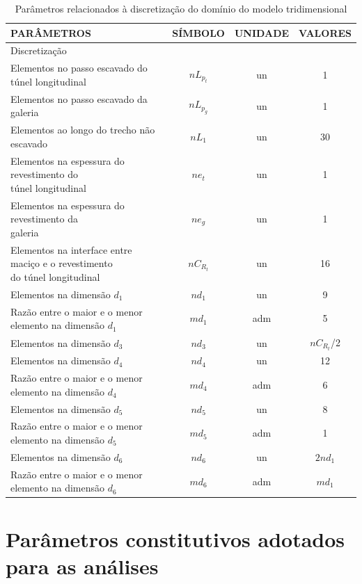 \begin{table}[H]
	\caption{Parâmetros relacionados à discretização do domínio do modelo tridimensional}
	\label{tabela3D_2}
	\centering
	\small
	\renewcommand{\arraystretch}{1.5}
	\begin{tabular}{l c c c}
		\hline
		\multicolumn{1}{l}{PARÂMETROS} &
		\multicolumn{1}{c}{SÍMBOLO} &
		\multicolumn{1}{c}{UNIDADE} &
		\multicolumn{1}{c}{VALORES} \\
		\hline
		\multicolumn{4}{l}{Discretização} \\
		\hline
		Elementos no passo escavado do túnel longitudinal & $nL_{p_t}$ & un & 1 \\
		Elementos no passo escavado da galeria & $nL_{p_g}$ & un & 1 \\
		Elementos ao longo do trecho não escavado & $nL_{1}$ & un & 30 \\
		\makecell[l]{Elementos na espessura do revestimento do \\ túnel longitudinal} & $ne_t$ & un & 1 \\
		\makecell[l]{Elementos na espessura do revestimento da \\ galeria} & $ne_g$ & un & 1 \\
		\makecell[l]{Elementos na interface entre maciço e o revestimento \\ do túnel longitudinal} & $nC_{R_t}$ & un & 16 \\ 
		Elementos na dimensão $d_1$ & $nd_1$ & un & 9 \\
		Razão entre o maior e o menor elemento na dimensão $d_1$ & $md_1$ & adm & 5 \\
		Elementos na dimensão $d_3$ & $nd_3$ & un & $nC_{R_t}$/2 \\
		Elementos na dimensão $d_4$ & $nd_4$ & un & 12 \\
		Razão entre o maior e o menor elemento na dimensão $d_4$ & $md_4$ & adm & 6 \\
		Elementos na dimensão $d_5$ & $nd_5$ & un & 8 \\
		Razão entre o maior e o menor elemento na dimensão $d_5$ & $md_5$ & adm & 1 \\	
		Elementos na dimensão $d_6$ & $nd_6$ & un & $2nd_1$ \\
		Razão entre o maior e o menor elemento na dimensão $d_6$ & $md_6$ & adm & $md_1$ \\	
		\hline
	\end{tabular}
	\normalsize
\end{table}


\section{Parâmetros constitutivos adotados para as análises}

